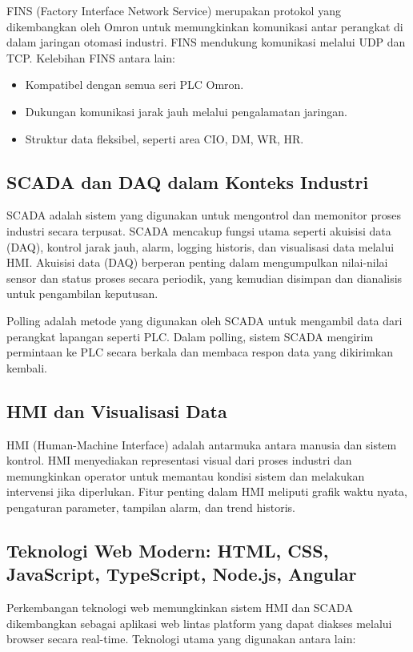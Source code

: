 FINS (Factory Interface Network Service) merupakan protokol yang dikembangkan oleh Omron untuk memungkinkan komunikasi antar perangkat di dalam jaringan otomasi industri. FINS mendukung komunikasi melalui UDP dan TCP. Kelebihan FINS antara lain:
\begin{itemize}
    \item Kompatibel dengan semua seri PLC Omron.
    \item Dukungan komunikasi jarak jauh melalui pengalamatan jaringan.
    \item Struktur data fleksibel, seperti area CIO, DM, WR, HR.
\end{itemize}

\subsection{SCADA dan DAQ dalam Konteks Industri}
SCADA adalah sistem yang digunakan untuk mengontrol dan memonitor proses industri secara terpusat. SCADA mencakup fungsi utama seperti akuisisi data (DAQ), kontrol jarak jauh, alarm, logging historis, dan visualisasi data melalui HMI. Akuisisi data (DAQ) berperan penting dalam mengumpulkan nilai-nilai sensor dan status proses secara periodik, yang kemudian disimpan dan dianalisis untuk pengambilan keputusan.

Polling adalah metode yang digunakan oleh SCADA untuk mengambil data dari perangkat lapangan seperti PLC. Dalam polling, sistem SCADA mengirim permintaan ke PLC secara berkala dan membaca respon data yang dikirimkan kembali.

\subsection{HMI dan Visualisasi Data}
HMI (Human-Machine Interface) adalah antarmuka antara manusia dan sistem kontrol. HMI menyediakan representasi visual dari proses industri dan memungkinkan operator untuk memantau kondisi sistem dan melakukan intervensi jika diperlukan. Fitur penting dalam HMI meliputi grafik waktu nyata, pengaturan parameter, tampilan alarm, dan trend historis.

\subsection{Teknologi Web Modern: HTML, CSS, JavaScript, TypeScript, Node.js, Angular}

Perkembangan teknologi web memungkinkan sistem HMI dan SCADA dikembangkan sebagai aplikasi web lintas platform yang dapat diakses melalui browser secara real-time. Teknologi utama yang digunakan antara lain:

